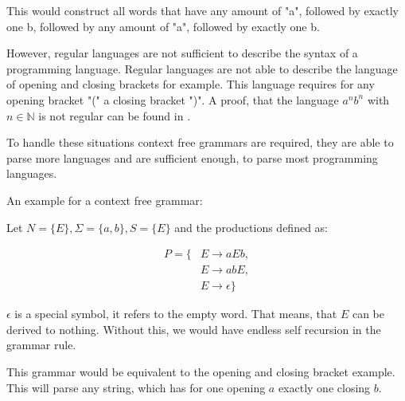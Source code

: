 This would construct all words that have any amount of "a", followed by exactly one b, followed by any amount of "a", followed by exactly one b.

However, regular languages are not sufficient to describe the syntax of a programming language. Regular languages are not able to describe the language of
opening and closing brackets for example.
This language requires for any opening bracket "(" a closing bracket ")".
A proof, that the language $a^nb^n$ with $n\in\mathbb{N}$ is not regular can be found in \cite[page 30]{theoretical_comp_sci}.

To handle these situations context free grammars are required, they are able to parse more languages and are sufficient enough, to parse most programming languages. 

An example for a context free grammar:

Let $N = \{E\}, \Sigma = \{a, b\}, S = \{E\}$ and the productions defined as:

\begin{align*}
P = \{&E \to a E b,\\
&E \to a b E,\\
&E \to \epsilon\}
\end{align*}

$\epsilon$ is a special symbol, it refers to the empty word. That means, that $E$ can be derived to nothing. Without this, we would have endless self recursion in the grammar rule.

This grammar would be equivalent to the opening and closing bracket example. This will parse any string, which has for one opening $a$ exactly one closing $b$.
